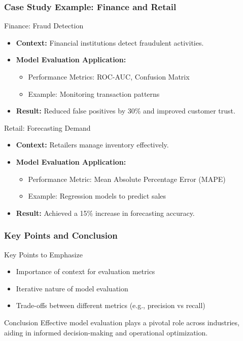 \documentclass[aspectratio=169]{beamer}
\begin{document}
\begin{frame}[fragile]
    \frametitle{Case Study Example: Finance and Retail}
    \begin{block}{Finance: Fraud Detection}
        \begin{itemize}
            \item \textbf{Context:} Financial institutions detect fraudulent activities.
            \item \textbf{Model Evaluation Application:}
                \begin{itemize}
                    \item Performance Metrics: ROC-AUC, Confusion Matrix
                    \item Example: Monitoring transaction patterns
                \end{itemize}
            \item \textbf{Result:} Reduced false positives by 30\% and improved customer trust.
        \end{itemize}
    \end{block}

    \begin{block}{Retail: Forecasting Demand}
        \begin{itemize}
            \item \textbf{Context:} Retailers manage inventory effectively.
            \item \textbf{Model Evaluation Application:}
                \begin{itemize}
                    \item Performance Metric: Mean Absolute Percentage Error (MAPE)
                    \item Example: Regression models to predict sales
                \end{itemize}
            \item \textbf{Result:} Achieved a 15\% increase in forecasting accuracy.
        \end{itemize}
    \end{block}
\end{frame}

\begin{frame}[fragile]
    \frametitle{Key Points and Conclusion}
    \begin{block}{Key Points to Emphasize}
        \begin{itemize}
            \item Importance of context for evaluation metrics
            \item Iterative nature of model evaluation
            \item Trade-offs between different metrics (e.g., precision vs recall)
        \end{itemize}
    \end{block}

    \begin{block}{Conclusion}
        Effective model evaluation plays a pivotal role across industries, aiding in informed decision-making and operational optimization.
    \end{block}
\end{frame}
\end{document}
